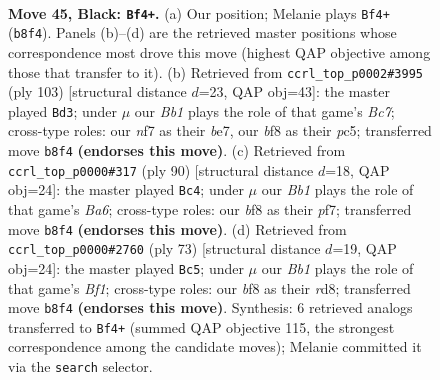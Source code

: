\documentclass[11pt]{article}
\begin{document}
\clearpage

\begin{figure}[p]\centering
\begin{subfigure}{0.46\textwidth}\centering
\resizebox{\linewidth}{!}{%
\newchessgame
\chessboard[
  setfen={1b3B2/p4N2/P4kP1/1P3p2/8/8/3K4/R7 b - - 0 45},
  showmover=false,
  pgfstyle=straightmove, color=movearrow, markmove={b8-f4}
]}
\caption{}
\end{subfigure}\hfill
\begin{subfigure}{0.46\textwidth}\centering
\resizebox{\linewidth}{!}{%
\newchessgame
\chessboard[
  setfen={8/3kB3/2pP2p1/2P1K2p/8/8/2b2P1P/8 b - - 14 52},
  showmover=false,
  pgfstyle=straightmove, color=movearrow, markmove={c2-d3}
]}
\caption{}
\end{subfigure}
\\[4pt]
\begin{subfigure}{0.46\textwidth}\centering
\resizebox{\linewidth}{!}{%
\newchessgame
\chessboard[
  setfen={8/5pk1/B7/2p3p1/3nP3/4K1PP/8/8 w - - 5 46},
  showmover=false,
  pgfstyle=straightmove, color=movearrow, markmove={a6-c4}
]}
\caption{}
\end{subfigure}\hfill
\begin{subfigure}{0.46\textwidth}\centering
\resizebox{\linewidth}{!}{%
\newchessgame
\chessboard[
  setfen={3R1b2/1p6/4kp2/p4N2/2P3P1/5K1P/1r6/8 b - - 1 37},
  showmover=false,
  pgfstyle=straightmove, color=movearrow, markmove={f8-c5}
]}
\caption{}
\end{subfigure}
\caption{\textbf{Move 45, Black: \texttt{Bf4+}.} (a) Our position; Melanie plays \texttt{Bf4+} (\texttt{b8f4}). Panels (b)--(d) are the retrieved master positions whose correspondence most drove this move (highest QAP objective among those that transfer to it). (b) Retrieved from \texttt{ccrl\_top\_p0002\#3995} (ply 103) [structural distance $d$=23, QAP obj=43]: the master played \texttt{Bd3}; under $\mu$ our \emph{Bb1} plays the role of that game's \emph{Bc7}; cross-type roles: our \emph{n}f7 as their \emph{b}e7, our \emph{b}f8 as their \emph{p}c5; transferred move \texttt{b8f4} \textbf{(endorses this move)}. (c) Retrieved from \texttt{ccrl\_top\_p0000\#317} (ply 90) [structural distance $d$=18, QAP obj=24]: the master played \texttt{Bc4}; under $\mu$ our \emph{Bb1} plays the role of that game's \emph{Ba6}; cross-type roles: our \emph{b}f8 as their \emph{p}f7; transferred move \texttt{b8f4} \textbf{(endorses this move)}. (d) Retrieved from \texttt{ccrl\_top\_p0000\#2760} (ply 73) [structural distance $d$=19, QAP obj=24]: the master played \texttt{Bc5}; under $\mu$ our \emph{Bb1} plays the role of that game's \emph{Bf1}; cross-type roles: our \emph{b}f8 as their \emph{r}d8; transferred move \texttt{b8f4} \textbf{(endorses this move)}. Synthesis: 6 retrieved analogs transferred to \texttt{Bf4+} (summed QAP objective 115, the strongest correspondence among the candidate moves); Melanie committed it via the \texttt{search} selector.}
\label{fig:thought-m89}
\end{figure}
\end{document}
